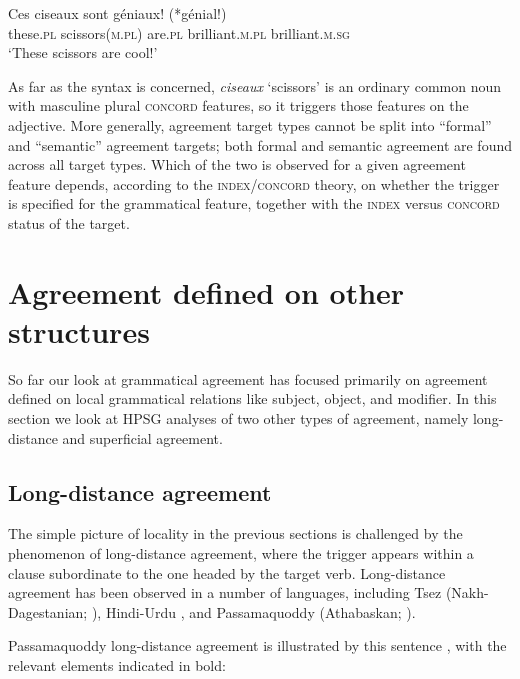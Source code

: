 \documentclass[output=paper
                ,modfonts
                ,nonflat
	        ,collection
	        ,collectionchapter
	        ,collectiontoclongg
 	        ,biblatex
                ,babelshorthands
                ,newtxmath
                ,draftmode
                ,colorlinks, citecolor=brown
]{./langsci/langscibook}
\begin{document}
{\begin{exe} 
\ex\label{ciseaux}
\gll   Ces	ciseaux	sont	g\'{e}niaux!	(*g\'{e}nial!) \\
		these.\textsc{pl}	scissors(\textsc{m.pl})	are.\textsc{pl} 	brilliant.\textsc{m.pl}	brilliant.\textsc{m.sg} \\
\glt		`These scissors are cool!’ 
\end{exe}

\noindent
As far as the syntax is concerned, \textit{ciseaux} `scissors’ is an ordinary common noun with masculine plural \textsc{concord} features, so it triggers those features on the adjective.  More generally, agreement target types cannot be split into ``formal'' and ``semantic'' agreement targets; both formal and semantic agreement are found across all target types.  Which of the two is observed for a given agreement feature depends, according to the  \textsc{index/concord}  theory,  on whether the trigger is specified for the grammatical feature, together with the  \textsc{index}  versus  \textsc{concord}  status of the target.  
 

\section{Agreement defined on other structures}
So far our look at grammatical agreement has focused primarily on agreement defined on local grammatical relations like subject, object, and modifier.  In this section we look at HPSG analyses of two other types of agreement, namely long-distance and superficial agreement.  

\subsection{Long-distance agreement}
\label{LDA}

The simple picture of locality in the previous sections is challenged by the phenomenon of long-distance agreement, where the trigger appears within a clause subordinate to the one headed by the target verb.  Long-distance agreement has been observed in a number of languages, including Tsez (Nakh-Dagestanian; \citealt{polinsky+potsdam:2001}), Hindi-Urdu \citep{bhatt:2005}, and Passamaquoddy (Athabaskan; \citealt{bruening:2001,LeSourd:2018}).  

Passamaquoddy long-distance agreement is illustrated by this sentence \citep[example\,(5)]{LeSourd:2018}, with the relevant elements indicated in bold:

}
\end{document}
